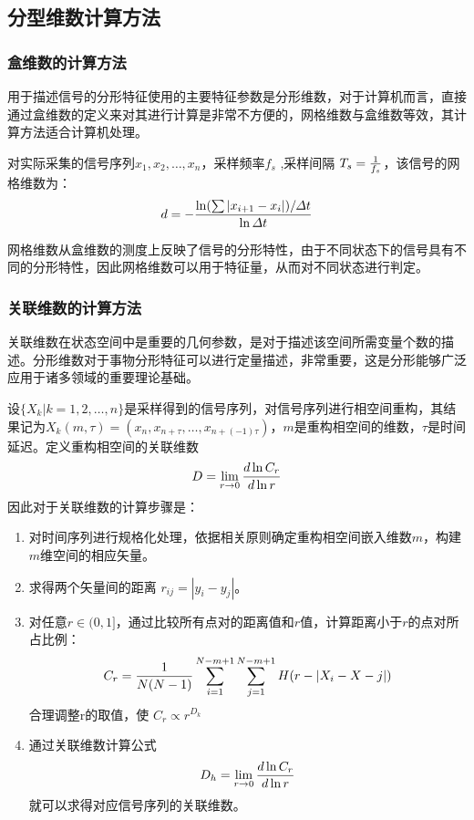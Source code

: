 \subsection{分型维数计算方法}
\subsubsection{盒维数的计算方法}
用于描述信号的分形特征使用的主要特征参数是分形维数，对于计算机而言，直接通过盒维数的定义来对其进行计算是非常不方便的，网格维数与盒维数等效，其计算方法适合计算机处理。

对实际采集的信号序列${ x_1,x_2,\dots,x_n}$，采样频率$f_s$ ,采样间隔 $T_s = {1\over f_s}$，该信号的网格维数为：
\begin{equation}
	d = -{\ln (\sum \left| x_{i+1}-x_i \right| ) /\varDelta t
		\over \ln \varDelta t}
\end{equation}

网格维数从盒维数的测度上反映了信号的分形特性，由于不同状态下的信号具有不同的分形特性，因此网格维数可以用于特征量，从而对不同状态进行判定。

\subsubsection{关联维数的计算方法}
关联维数在状态空间中是重要的几何参数，是对于描述该空间所需变量个数的描述。分形维数对于事物分形特征可以进行定量描述，非常重要，这是分形能够广泛应用于诸多领域的重要理论基础。

设$\{ X_k | k = 1,2,\dots,n \}$是采样得到的信号序列，对信号序列进行相空间重构，其结果记为$X_k(m,\tau) = (x_n,x_{n+\tau},\dots,x_{n+(-1)\tau})$，$m$是重构相空间的维数，$\tau$是时间延迟。定义重构相空间的关联维数
\begin{equation}
	D = \lim\limits_{r\rightarrow 0}{d \ln C_r \over d \ln r}
\end{equation}
因此对于关联维数的计算步骤是：
\begin{enumerate}[label=（\arabic*）]
	\item 对时间序列进行规格化处理，依据相关原则确定重构相空间嵌入维数$m$，构建$m$维空间的相应矢量。
	\item 求得两个矢量间的距离 $r_{ij} = \left| y_i - y_j \right| $。
	\item 对任意$r\in (0,1]$，通过比较所有点对的距离值和$r$值，计算距离小于$r$的点对所占比例：
	\begin{equation}
		C_r = {1\over N(N-1)} \sum_{i=1}^{N-m+1}\sum_{j=1}^{N-m+1}
		H(r-\left| X_i-X-j \right| )
	\end{equation}
	合理调整r的取值，使 $C_r \propto r^{D_k}$
	\item 通过关联维数计算公式
	$$
	D_h = \lim\limits_{r\rightarrow 0}{d \ln C_r \over d \ln r}
	$$
	就可以求得对应信号序列的关联维数。
\end{enumerate}

